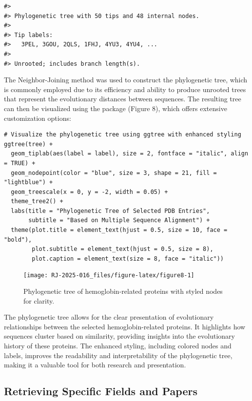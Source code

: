 \begin{verbatim}
#> 
#> Phylogenetic tree with 50 tips and 48 internal nodes.
#> 
#> Tip labels:
#>   3PEL, 3GOU, 2QLS, 1FHJ, 4YU3, 4YU4, ...
#> 
#> Unrooted; includes branch length(s).
\end{verbatim}

The Neighbor-Joining method \citep{saitou1987neighbor} was used to construct the phylogenetic tree, which is commonly employed due to its efficiency and ability to produce unrooted trees that represent the evolutionary distances between sequences. The resulting tree can then be visualized using the  package (Figure 8), which offers extensive customization options:

\begin{verbatim}
# Visualize the phylogenetic tree using ggtree with enhanced styling
ggtree(tree) +
  geom_tiplab(aes(label = label), size = 2, fontface = "italic", align = TRUE) +
  geom_nodepoint(color = "blue", size = 3, shape = 21, fill = "lightblue") +
  geom_treescale(x = 0, y = -2, width = 0.05) +
  theme_tree2() +
  labs(title = "Phylogenetic Tree of Selected PDB Entries",
       subtitle = "Based on Multiple Sequence Alignment") +
  theme(plot.title = element_text(hjust = 0.5, size = 10, face = "bold"),
        plot.subtitle = element_text(hjust = 0.5, size = 8),
        plot.caption = element_text(size = 8, face = "italic"))
\end{verbatim}

\begin{figure}[H]
\texttt{[image: RJ-2025-016\_files/figure-latex/figure8-1]} \caption{Phylogenetic tree of hemoglobin-related proteins with styled nodes for clarity.}\label{fig:figure8}
\end{figure}

The phylogenetic tree allows for the clear presentation of evolutionary relationships between the selected hemoglobin-related proteins. It highlights how sequences cluster based on similarity, providing insights into the evolutionary history of these proteins. The enhanced styling, including colored nodes and labels, improves the readability and interpretability of the phylogenetic tree, making it a valuable tool for both research and presentation.

\subsection{Retrieving Specific Fields and Papers}\label{retrieving-specific-fields-and-papers}

